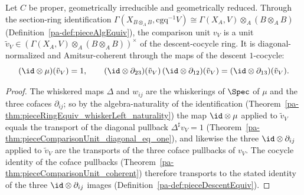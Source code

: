 \begin{theorem}
  \label{pa-thm:pieceComparisonTensorUnit}
  \leanok

  Let \(C\) be proper, geometrically irreducible and geometrically reduced. Through the section-ring
  identification \(\Gamma(X_{B \otimes_A B}, \mathrm{cgq}^{-1}V) \cong \Gamma(X_A, V) \otimes_A (B
  \otimes_A B)\) (Definition~\ref{pa-def:pieceAlgEquiv}), the comparison unit \(v_V\) is a unit
  \(\tilde v_V \in (\Gamma(X_A, V) \otimes_A (B \otimes_A B))^{\times}\) of the descent-cocycle ring.
  It is diagonal-normalized and Amitsur-coherent through the maps of the descent \(1\)-cocycle:
  \[
    (\id \otimes \mu)(\tilde v_V) = 1, \qquad
    (\id \otimes \partial_{23})(\tilde v_V)\,(\id \otimes \partial_{12})(\tilde v_V)
      = (\id \otimes \partial_{13})(\tilde v_V) .
  \]
\end{theorem}
\begin{proof}
  \leanok
  The whiskered maps \(\Delta\) and \(w_{ij}\) are the whiskerings of \(\Spec\) of \(\mu\) and the
  three cofaces \(\partial_{ij}\); so by the algebra-naturality of the identification
  (Theorem~\ref{pa-thm:pieceRingEquiv_whiskerLeft_naturality}) the map \(\id \otimes \mu\) applied to
  \(\tilde v_V\) equals the transport of the diagonal pullback \(\Delta^{\sharp}v_V = 1\)
  (Theorem~\ref{pa-thm:pieceComparisonUnit_diagonal_eq_one}), and likewise the three \(\id \otimes
  \partial_{ij}\) applied to \(\tilde v_V\) are the transports of the three coface pullbacks of
  \(v_V\). The cocycle identity of the coface pullbacks
  (Theorem~\ref{pa-thm:pieceComparisonUnit_coherent}) therefore transports to the stated identity of
  the three \(\id \otimes \partial_{ij}\) images (Definition~\ref{pa-def:pieceDescentEquiv}).
\end{proof}

